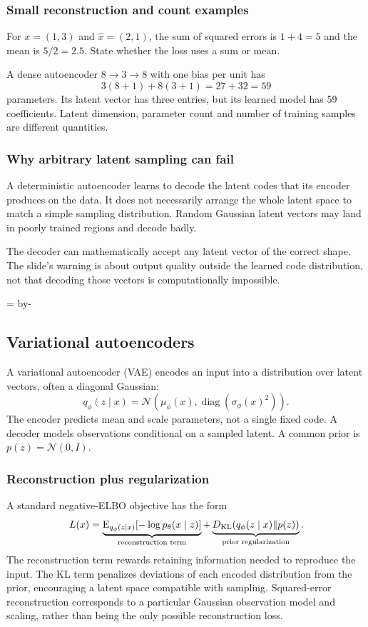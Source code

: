 \documentclass[11pt]{article}
\newcommand{\newsubsection}[1]{\par\begingroup\skip0=\pagegoal\advance\skip0 by-\pagetotal\ifdim\skip0<12\baselineskip\newpage\fi\endgroup\subsection{#1}}
\begin{document}
\subsubsection{Small reconstruction and count examples}
For $x=(1,3)$ and $\widehat{x}=(2,1)$, the sum of squared errors is $1+4=5$ and the mean is $5/2=2.5$. State whether the loss uses a sum or mean.

A dense autoencoder $8\to3\to8$ with one bias per unit has
\[
3(8+1)+8(3+1)=27+32=59
\]
parameters. Its latent vector has three entries, but its learned model has 59 coefficients. Latent dimension, parameter count and number of training samples are different quantities.

\subsubsection{Why arbitrary latent sampling can fail}
A deterministic autoencoder learns to decode the latent codes that its encoder produces on the data. It does not necessarily arrange the whole latent space to match a simple sampling distribution. Random Gaussian latent vectors may land in poorly trained regions and decode badly.

The decoder can mathematically accept any latent vector of the correct shape. The slide's warning is about output quality outside the learned code distribution, not that decoding those vectors is computationally impossible.

\newsubsection{Variational autoencoders}
A variational autoencoder (VAE) encodes an input into a distribution over latent vectors, often a diagonal Gaussian:
\[
q_\phi(z\mid x)=\mathcal N\!\left(\mu_\phi(x),
\operatorname{diag}(\sigma_\phi(x)^2)\right).
\]
The encoder predicts mean and scale parameters, not a single fixed code. A decoder models observations conditional on a sampled latent. A common prior is $p(z)=\mathcal N(0,I)$.

\subsubsection{Reconstruction plus regularization}
A standard negative-ELBO objective has the form
\[
L(x)=
\underbrace{\operatorname{E}_{q_\phi(z\mid x)}[-\log p_\theta(x\mid z)]}_{\text{reconstruction term}}
+\underbrace{D_{\mathrm{KL}}(q_\phi(z\mid x)\|p(z))}_{\text{prior regularization}}.
\]
The reconstruction term rewards retaining information needed to reproduce the input. The KL term penalizes deviations of each encoded distribution from the prior, encouraging a latent space compatible with sampling. Squared-error reconstruction corresponds to a particular Gaussian observation model and scaling, rather than being the only possible reconstruction loss.
\end{document}
